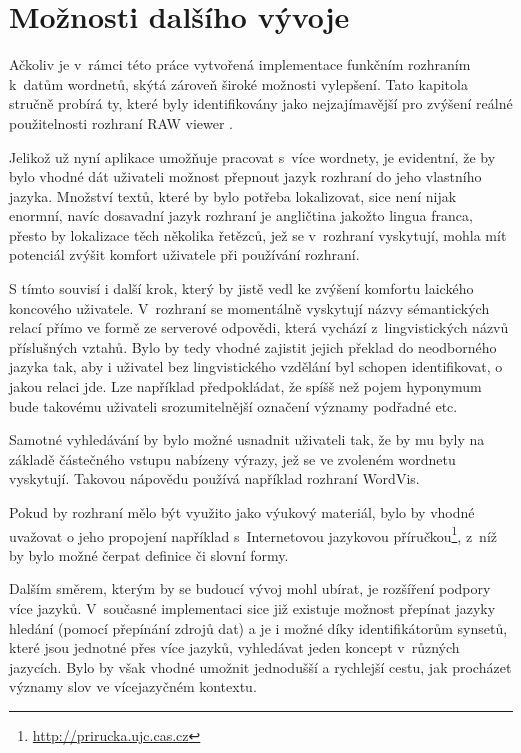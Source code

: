 \documentclass[a4paper,11pt,openany,twoside]{book}
\newcommand{\simplywn}{RAW viewer }
\newcommand\ex{\textsf}
\begin{document}
		\chapter{Možnosti dalšího vývoje}
		\label{cha:co-se-nestihlo}

			Ačkoliv je v~rámci této práce vytvořená implementace funkčním rozhraním k~datům wordnetů, skýtá zároveň široké možnosti vylepšení. Tato kapitola stručně probírá ty, které byly identifikovány jako nejzajímavější pro zvýšení reálné použitelnosti rozhraní \simplywn. 

			Jelikož už nyní aplikace umožňuje pracovat s~více wordnety, je evidentní, že by bylo vhodné dát uživateli možnost přepnout jazyk rozhraní do jeho vlastního jazyka. Množství textů, které by bylo potřeba lokalizovat, sice není nijak enormní, navíc dosavadní jazyk rozhraní je angličtina jakožto lingua franca, přesto by lokalizace těch několika řetězců, jež se v~rozhraní vyskytují, mohla mít potenciál zvýšit komfort uživatele při používání rozhraní.

			S tímto souvisí i další krok, který by jistě vedl ke zvýšení komfortu laického koncového uživatele. V~rozhraní se momentálně vyskytují názvy sémantických relací přímo ve formě ze serverové odpovědi, která vychází z~lingvistických názvů příslušných vztahů. Bylo by tedy vhodné zajistit jejich překlad do neodborného jazyka tak, aby i uživatel bez lingvistického vzdělání byl schopen identifikovat, o jakou relaci jde. Lze například předpokládat, že spíšš než pojem \ex{hyponymum} bude takovému uživateli srozumitelnější označení \ex{významy podřadné} etc.

			Samotné vyhledávání by bylo možné usnadnit uživateli tak, že by mu byly na základě částečného vstupu nabízeny výrazy, jež se ve zvoleném wordnetu vyskytují. Takovou nápovědu používá například rozhraní WordVis. \parencite{wordvis2010vercruysse}

			Pokud by rozhraní mělo být využito jako výukový materiál, bylo by vhodné uvažovat o jeho propojení například s~Internetovou jazykovou příručkou\footnote{\url{http://prirucka.ujc.cas.cz}}, z~níž by bylo možné čerpat definice či slovní formy.

			Dalším směrem, kterým by se budoucí vývoj mohl ubírat, je rozšíření podpory více jazyků. V~současné implementaci sice již existuje možnost přepínat jazyky hledání (pomocí přepínání zdrojů dat) a je i možné díky identifikátorům synsetů, které jsou jednotné přes více jazyků, vyhledávat jeden koncept v~různých jazycích. Bylo by však vhodné umožnit jednodušší a rychlejší cestu, jak procházet významy slov ve vícejazyčném kontextu.
\end{document}
